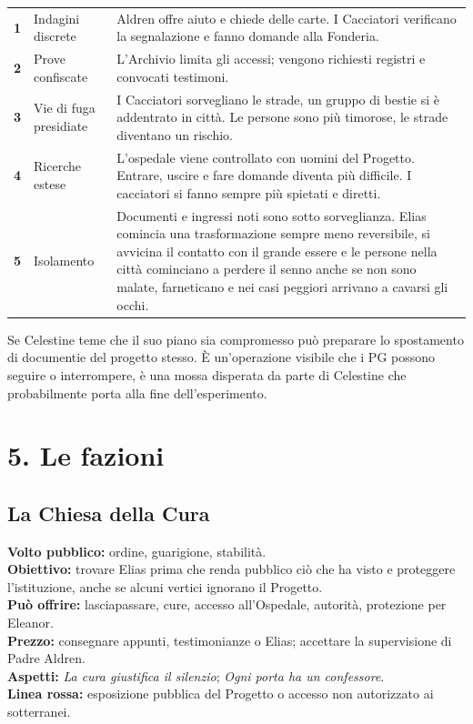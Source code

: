 \documentclass[11pt,a4paper]{article}
\newcommand{\aspect}[1]{\textit{\textcolor{blood}{#1}}}
\begin{document}
\begin{tabularx}{\linewidth}{>{\bfseries}p{12mm} p{35mm} X}
1 & Indagini discrete & Aldren offre aiuto e chiede delle carte. I Cacciatori verificano la segnalazione e fanno domande alla Fonderia.\\
2 & Prove confiscate & L'Archivio limita gli accessi; vengono richiesti registri e convocati testimoni.\\
3 & Vie di fuga presidiate & I Cacciatori sorvegliano le strade, un gruppo di bestie si è addentrato in città. Le persone sono più timorose, le strade diventano un rischio.\\
4 & Ricerche estese & L'ospedale viene controllato con uomini del Progetto. Entrare, uscire e fare domande diventa più difficile. I cacciatori si fanno sempre più spietati e diretti.\\
5 & Isolamento & Documenti e ingressi noti sono sotto sorveglianza. Elias comincia una trasformazione sempre meno reversibile, si avvicina il contatto con il grande essere e le persone nella città cominciano a perdere il senno anche se non sono malate, farneticano e nei casi peggiori arrivano a cavarsi gli occhi.\\
\end{tabularx}

\begin{clockbox}
Se Celestine teme che il suo piano sia compromesso può preparare lo spostamento di documentie del progetto stesso. È un'operazione visibile che i PG possono seguire o interrompere, è una mossa disperata da parte di Celestine che probabilmente porta alla fine dell'esperimento.
\end{clockbox}

\section{5. Le fazioni}

\subsection{La Chiesa della Cura}
\textbf{Volto pubblico:} ordine, guarigione, stabilità.\\
\textbf{Obiettivo:} trovare Elias prima che renda pubblico ciò che ha visto e proteggere l'istituzione, anche se alcuni vertici ignorano il Progetto.\\
\textbf{Può offrire:} lasciapassare, cure, accesso all'Ospedale, autorità, protezione per Eleanor.\\
\textbf{Prezzo:} consegnare appunti, testimonianze o Elias; accettare la supervisione di Padre Aldren.\\
\textbf{Aspetti:} \aspect{La cura giustifica il silenzio}; \aspect{Ogni porta ha un confessore}.\\
\textbf{Linea rossa:} esposizione pubblica del Progetto o accesso non autorizzato ai sotterranei.
\end{document}
